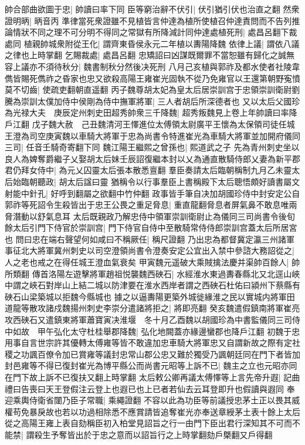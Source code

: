 帥合部曲欲圖于忠|{
	帥讀曰率下同}
臣等窮治辭不伏引|{
	伏引猶引伏也治直之翻}
然衆證明昞|{
	昞音丙}
準律當死衆證雖不見植皆言仲達為植所使植召仲達責問而不告列推論情狀不同之理不可分明不得同之常獄有所降減計同仲達處植死刑|{
	處昌呂翻下裁處同}
植親帥城衆附從王化|{
	謂齊東昏侯永元二年植以夀陽降魏}
依律上議|{
	謂依八議之律也上時掌翻}
乞賜裁處|{
	處昌呂翻}
忠矯詔曰凶謀既爾罪不當恕雖有歸化之誠無容上議亦不須待秋分|{
	魏書制秋分然後决死刑}
八月己亥植與郭祚及都水使者社陵韋儁皆賜死儁祚之昏家也忠又欲殺高陽王雍崔光固執不從乃免雍官以王還第朝野寃憤莫不切齒|{
	使疏吏翻朝直遥翻}
丙子魏尊胡太妃為皇太后居崇訓宫于忠領崇訓衛尉劉騰為崇訓太僕加侍中侯剛為侍中撫軍將軍|{
	三人者胡后所深德者也}
又以太后父國珍為光禄大夫　庚辰定州刺史田超秀帥衆三千降魏|{
	超秀叛魏見上卷上年帥讀曰率降戶江翻}
戊子魏大赦　己丑魏清河王懌進位太傅領太尉廣平王懷為太保領司徒任城王澄為司空庚寅魏以車騎大將軍于忠為尚書令特進崔光為車騎大將軍並加開府儀同三司|{
	任音壬騎奇寄翻下同}
魏江陽王繼熙之曾孫也|{
	熙道武之子}
先為青州刺史坐以良人為婢奪爵繼子乂娶胡太后妹壬辰詔復繼本封以乂為通直散騎侍郎乂妻為新平郡君仍拜女侍中|{
	為元乂囚靈太后張本散悉亶翻}
羣臣奏請太后臨朝稱制九月乙未靈太后始臨朝聽政|{
	胡太后諡曰靈}
猶稱令以行事羣臣上書稱殿下太后聰悟頗好讀書屬文射能中針孔|{
	好呼到翻屬之欲翻中竹仲翻}
政事皆手筆自决加胡國珍侍中封安定公自郭祚等死詔令生殺皆出于忠王公畏之重足脅息|{
	重直龍翻脅息者屏氣鼻不敢息唯兩脅潛動以舒氣息耳}
太后既親政乃解忠侍中領軍崇訓衛尉止為儀同三司尚書令後旬餘太后引門下侍官於崇訓宫|{
	門下侍官自侍中至散騎常侍侍郎崇訓宫蓋太后所居宮也}
問曰忠在端右聲望何如咸曰不稱厥任|{
	稱尺證翻}
乃出忠為都督冀定瀛三州諸軍事征北大將軍冀州刺史以司空澄領尚書令澄奏安定公宜出入禁中參諮大務詔從之|{
	人之老也戒之在得任城王澄血氣衰矣}
甲寅魏元遥破大乘賊擒法慶并渠帥百餘人|{
	帥所類翻}
傳首洛陽左遊擊將軍趙祖悦襲魏西硤石|{
	水經淮水東過夀春縣北又北逕山峽中謂之峽石對岸山上結二城以防津要在淮水西岸者謂之西硤石杜佑曰潁州下蔡縣有硤石山梁築城以拒魏今縣城也}
據之以逼夀陽更築外城徙緣淮之民以實城内將軍田道龍等散攻諸戍魏揚州刺史李崇分遣諸將拒之|{
	將即亮翻}
癸亥魏遣假鎮南將軍崔亮攻西硤石又遣鎮東將軍蕭寶寅决淮堰　冬十月乙酉魏以胡國珍為中書監儀同三司侍中如故　甲午弘化太守杜桂舉郡降魏|{
	弘化地闕蓋亦緣邊蠻郡也降戶江翻}
初魏于忠用事自言世宗許其優轉太傅雍等皆不敢違加忠車騎大將軍忠又自謂新故之際有定社稷之功諷百僚令加已賞雍等議封忠常山郡公忠又難於獨受乃諷朝廷同在門下者皆加封邑雍等不得已復封崔光為博平縣公而尚書元昭等上訴不已|{
	魏主之立也元昭亦同在門下故上訴不已復扶又翻上時掌翻}
太后敕公卿再議太傅懌等上言先帝升遐|{
	記曲禮曰告喪曰天王登假注云登上也遐已也上已者若仙去云耳登即升也假讀與遐同}
奉迎乘輿侍衛省闥乃臣子常職|{
	乘繩證翻}
不容以此為功臣等前議授忠茅土正以畏其威權苟免暴戾故也若以功過相除悉不應賞請皆追奪崔光亦奉送章綬茅土表十餘上太后從之高陽王雍上表自劾稱臣初入柏堂見詔旨之行一由門下臣出君行深知其不可而不能禁|{
	謂殺生予奪皆出於于忠之意而以詔旨行之上時掌翻劾戶槩翻又戶得翻}
